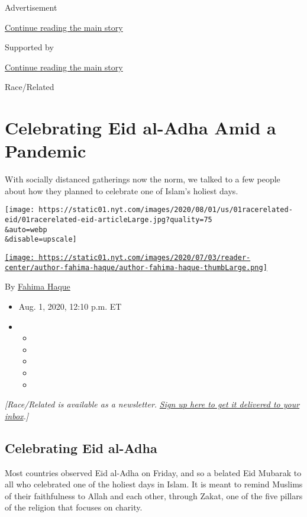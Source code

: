 Advertisement

\protect\hyperlink{after-top}{Continue reading the main story}

Supported by

\protect\hyperlink{after-sponsor}{Continue reading the main story}

Race/Related

\hypertarget{celebrating-eid-al-adha-amid-a-pandemic}{%
\section{Celebrating Eid al-Adha Amid a
Pandemic}\label{celebrating-eid-al-adha-amid-a-pandemic}}

With socially distanced gatherings now the norm, we talked to a few
people about how they planned to celebrate one of Islam's holiest days.

\texttt{[image: https://static01.nyt.com/images/2020/08/01/us/01racerelated-eid/01racerelated-eid-articleLarge.jpg?quality=75\\\&auto=webp\\\&disable=upscale]}

\href{https://www.nytimes.com/by/fahima-haque}{\texttt{[image: https://static01.nyt.com/images/2020/07/03/reader-center/author-fahima-haque/author-fahima-haque-thumbLarge.png]}}

By \href{https://www.nytimes.com/by/fahima-haque}{Fahima Haque}

\begin{itemize}
\item
  Aug. 1, 2020, 12:10 p.m. ET
\item
  \begin{itemize}
  \item
  \item
  \item
  \item
  \item
  \end{itemize}
\end{itemize}

\emph{{[}Race/Related is available as a newsletter.}
\href{https://www.nytimes.com/newsletters/race-related}{\emph{Sign up
here to get it delivered to your inbox}}\emph{.{]}}

\hypertarget{celebrating-eid-al-adha}{%
\subsection{Celebrating Eid al-Adha}\label{celebrating-eid-al-adha}}

Most countries observed Eid al-Adha on Friday, and so a belated Eid
Mubarak to all who celebrated one of the holiest days in Islam. It is
meant to remind Muslims of their faithfulness to Allah and each other,
through Zakat, one of the five pillars of the religion that focuses on
charity.

